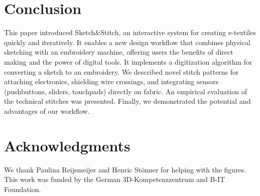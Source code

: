 \documentclass[header.tex]{subfiles}
\begin{document}


\section{Conclusion}
This paper introduced Sketch\&Stitch, an interactive system for creating e-textiles quickly and iteratively. It enables a new design workflow that combines physical sketching with an embroidery machine, offering users the benefits of direct making and the power of digital tools. %
It implements a digitization algorithm for converting a sketch to an embroidery. We described novel stitch patterns for attaching electronics, shielding wire crossings, and integrating sensors (pushbuttons, sliders, touchpads) directly on fabric. An empirical evaluation of the technical stitches was presented. Finally, we demonstrated the potential and advantages of our workflow.





\section{Acknowledgments}
We thank Paulina Reijsmeijer and Henric St{\"o}nner for helping with the figures. This work was funded by the German 3D-Kompetenzzentrum and B-IT Foundation.

\balance{}



\end{document}
